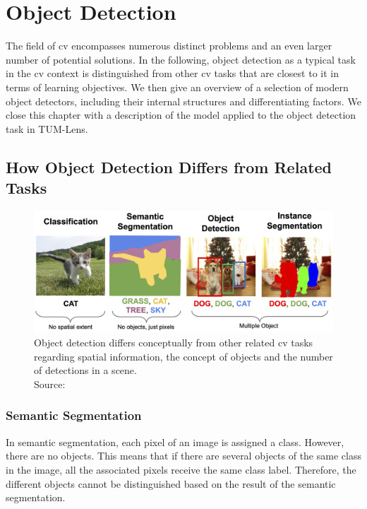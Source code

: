 \documentclass[
			   fontsize=11pt,
               paper=a4,
               bibliography=totoc,
               idxtotoc,
               headsepline,
               footsepline,
               footinclude=false,
               BCOR=12mm,
               DIV=13,
               openany,   %
               oneside    %
               ]
               {scrbook}
\begin{document}
\chapter{Object Detection}

The field of \gls{cv} encompasses numerous distinct problems and an even larger number of potential solutions. In the following, object detection as a typical task in the \gls{cv} context is distinguished from other \gls{cv} tasks that are closest to it in terms of learning objectives. We then give an overview of a selection of modern object detectors, including their internal structures and differentiating factors. We close this chapter with a description of the model applied to the object detection task in TUM-Lens.

\section{How Object Detection Differs from Related Tasks} \label{sec:cvtasks}

\begin{figure}[H] %
	\centering
	\includegraphics[width=\textwidth]{figures/detection_related_tasks.png}
	\caption[Typical Computer Vision Tasks]{Object detection differs conceptually from other related \gls{cv} tasks regarding spatial information, the concept of objects and the number of detections in a scene.\\
		\tiny{Source:~\cite{cvTasks}}}
	\label{fig:cvTasks} %
\end{figure}

\subsection{Semantic Segmentation}
In semantic segmentation, each pixel of an image is assigned a class. However, there are no objects. This means that if there are several objects of the same class in the image, all the associated pixels receive the same class label. Therefore, the different objects cannot be distinguished based on the result of the semantic segmentation.
\end{document}
